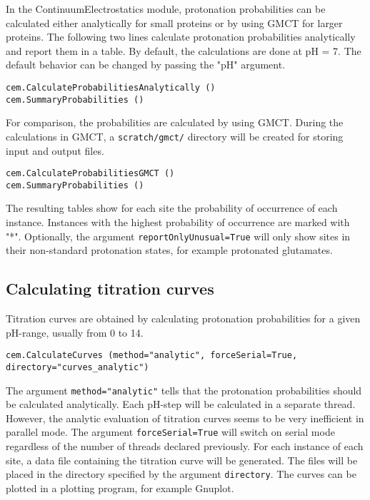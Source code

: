 \documentclass[a4paper,11pt]{article}
\newcommand{\modulename}{ContinuumElectrostatics\xspace}
\begin{document}
{\bigskip
In the \modulename module, protonation probabilities can be calculated either analytically for
small proteins or by using GMCT for larger proteins.
%
The following two lines calculate protonation probabilities analytically and report them
in a table.
%
By default, the calculations are done at pH = 7.
%
The default behavior can be changed by passing the "pH" argument. 

{\footnotesize \begin{lstlisting}
cem.CalculateProbabilitiesAnalytically ()
cem.SummaryProbabilities ()
\end{lstlisting} }


\bigskip
For comparison, the probabilities are calculated by using GMCT. 
%
During the calculations in GMCT, a \texttt{scratch/gmct/} directory will be created
for storing input and output files.

{\footnotesize \begin{lstlisting}
cem.CalculateProbabilitiesGMCT ()
cem.SummaryProbabilities ()
\end{lstlisting} }

\bigskip
The resulting tables show for each site the probability of occurrence of each instance. 
%
Instances with the highest probability of occurrence are marked with "*".
%
Optionally, the argument \texttt{reportOnlyUnusual=True} will only show sites 
in their non-standard  protonation states, for example protonated glutamates.


\subsection{Calculating titration curves}
Titration curves are obtained by calculating protonation probabilities for a given pH-range, 
usually from 0 to 14.

{\footnotesize \begin{lstlisting}
cem.CalculateCurves (method="analytic", forceSerial=True, directory="curves_analytic")
\end{lstlisting} }

\bigskip
The argument \texttt{method="analytic"} tells that the protonation probabilities should be
calculated analytically.
%
Each pH-step will be calculated in a separate thread.
%
However, the analytic evaluation of titration curves seems to be very inefficient in parallel 
mode.
%
The argument \texttt{forceSerial=True} will switch on serial mode regardless of the number 
of threads declared previously.
%
For each instance of each site, a data file containing the titration curve will be generated.
%
The files will be placed in the directory specified by the argument \texttt{directory}.
%
The curves can be plotted in a plotting program, for example Gnuplot.

}
\end{document}
